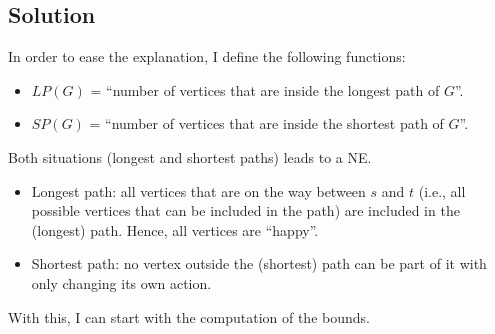 \documentclass[a4paper, 11pt]{article}
\begin{document}
\subsection*{Solution}
In order to ease the explanation, I define the following functions:
\begin{itemize}
    \item $LP(G)$ = ``number of vertices that are inside the longest path of $G$''.
    \item $SP(G)$ = ``number of vertices that are inside the shortest path of $G$''.
\end{itemize}
Both situations (longest and shortest paths) leads to a NE.
\begin{itemize}
    \item Longest path: all vertices that are on the way between $s$ and $t$ (i.e., all possible vertices that can be included in the path) are included in the (longest) path. Hence, all vertices are ``happy''.
    \item Shortest path: no vertex outside the (shortest) path can be part of it with only changing its own action.
\end{itemize}
With this, I can start with the computation of the bounds.
\end{document}
